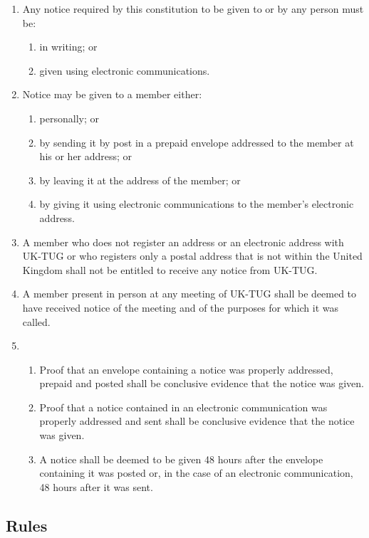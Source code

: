 \documentclass[a4paper,11pt]{article}
\begin{document}
\begin{enumerate}
\item Any notice required by this constitution to be given to or by any person
  must be:
  \begin{enumerate}
  \item in writing; or
  \item given using electronic communications.
  \end{enumerate}
\item Notice may be given to a member either:
  \begin{enumerate}
  \item personally; or
  \item by sending it by post in a prepaid envelope addressed to the member at
    his or her address; or
  \item by leaving it at the address of the member; or
  \item by giving it using electronic communications to the member's electronic address.
  \end{enumerate}
\item A member who does not register an address or an electronic address with UK-TUG or who registers
  only a postal address that is not within the United Kingdom shall not be
  entitled to receive any notice from UK-TUG.
\item A member present in person at any meeting of UK-TUG shall be deemed to
  have received notice of the meeting and of the purposes for which it was
  called.
\item
  \begin{enumerate}
  \item Proof that an envelope containing a notice was properly addressed,
    prepaid and posted shall be conclusive evidence that the notice was given.
  \item Proof that a notice contained in an electronic communication was
    properly addressed and sent shall be conclusive evidence that the notice was
    given.
  \item A notice shall be deemed to be given 48 hours after the envelope
    containing it was posted or, in the case of an electronic communication, 48
    hours after it was sent.
  \end{enumerate}
\end{enumerate}

\subsection{Rules}
\end{document}
